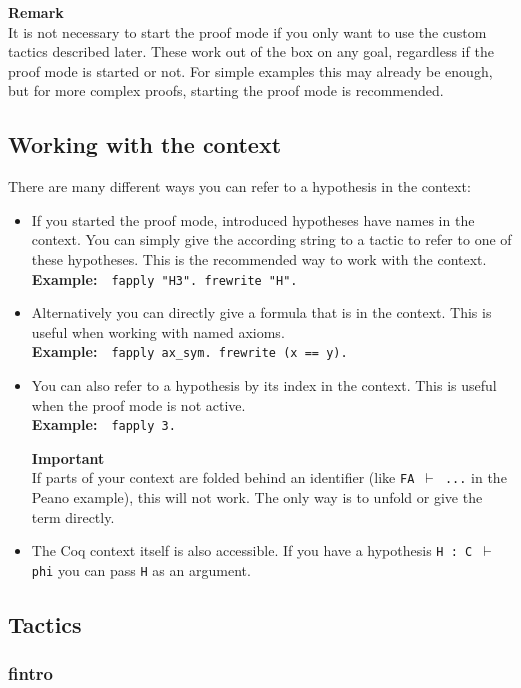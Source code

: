 \documentclass[12pt, a4paper]{article}
\newcommand{\coq}[1]{\texttt{#1}}
\newcommand{\important}[1]{
	\vspace{3pt}
	\begin{boximportant}
		\parbox{\textwidth}{\textcolor{colorimportant}{\textbf{Important}\\#1}}
	\end{boximportant}}
\newcommand{\remark}[1]{
	\vspace{3pt}
	\begin{boxremark}
		\parbox{\textwidth}{\textbf{Remark}\\#1}
	\end{boxremark}}
\newcommand{\example}[1]{\medskip\\\textbf{Example:}~~#1}
\begin{document}
\remark{It is not necessary to start the proof mode if you only want to use the custom tactics described later. These work out of the box on any goal, regardless if the proof mode is started or not. For simple examples this may already be enough, but for more complex proofs, starting the proof mode is recommended.}


\subsection{Working with the context}

There are many different ways you can refer to a hypothesis in the context:
\begin{itemize}
	\item 
	If you started the proof mode, introduced hypotheses have names in the context. 
	You can simply give the according string to a tactic to refer to one of these hypotheses. 
	This is the recommended way to work with the context.
	\example{\coq{fapply "H3". frewrite "H".}}
	
	\item 
	Alternatively you can directly give a formula that is in the context. 
	This is useful when working with named axioms.
	\example{\coq{fapply ax_sym. frewrite (x == y).}}
	
	\item 
	You can also refer to a hypothesis by its index in the context. 
	This is useful when the proof mode is not active.
	\example{\coq{fapply 3.}}
	\important{If parts of your context are folded behind an identifier (like \texttt{FA $\vdash$ ...} in the Peano example), this will not work. The only way is to unfold or give the term directly.}
	
	\item 
	The Coq context itself is also accessible. 
	If you have a hypothesis \texttt{H : C $\vdash$ phi} you can pass \texttt{H} as an argument.
\end{itemize}




\subsection{Tactics}

\subsubsection{\ttfamily fintro}
\end{document}
